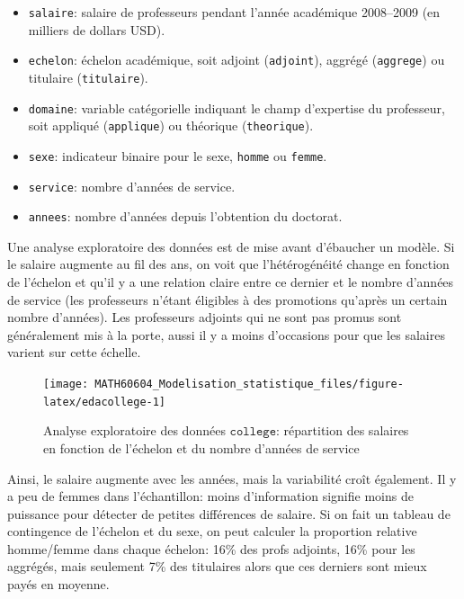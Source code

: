 \documentclass[
  11pt,
  letterpaper,
]{article}
\providecommand{\tightlist}{%
  \setlength{\itemsep}{0pt}\setlength{\parskip}{0pt}}
\theoremstyle{definition}
\theoremstyle{definition}
\theoremstyle{definition}
\theoremstyle{definition}
\theoremstyle{remark}
\begin{document}
\begin{itemize}
\tightlist
\item
  \texttt{salaire}: salaire de professeurs pendant l'année académique 2008--2009 (en milliers de dollars USD).
\item
  \texttt{echelon}: échelon académique, soit adjoint (\texttt{adjoint}), aggrégé (\texttt{aggrege}) ou titulaire (\texttt{titulaire}).
\item
  \texttt{domaine}: variable catégorielle indiquant le champ d'expertise du professeur, soit appliqué (\texttt{applique}) ou théorique (\texttt{theorique}).
\item
  \texttt{sexe}: indicateur binaire pour le sexe, \texttt{homme} ou \texttt{femme}.
\item
  \texttt{service}: nombre d'années de service.
\item
  \texttt{annees}: nombre d'années depuis l'obtention du doctorat.
\end{itemize}

Une analyse exploratoire des données est de mise avant d'ébaucher un modèle. Si le salaire augmente au fil des ans, on voit que l'hétérogénéité change en fonction de l'échelon et qu'il y a une relation claire entre ce dernier et le nombre d'années de service (les professeurs n'étant éligibles à des promotions qu'après un certain nombre d'années). Les professeurs adjoints qui ne sont pas promus sont généralement mis à la porte, aussi il y a moins d'occasions pour que les salaires varient sur cette échelle.

\begin{figure}

{\centering \texttt{[image: MATH60604\_Modelisation\_statistique\_files/figure-latex/edacollege-1]} 

}

\caption{Analyse exploratoire des données $\texttt{college}$: répartition des salaires en fonction de l'échelon et du nombre d'années de service}\label{fig:edacollege}
\end{figure}

Ainsi, le salaire augmente avec les années, mais la variabilité croît également. Il y a peu de femmes dans l'échantillon: moins d'information signifie moins de puissance pour détecter de petites différences de salaire. Si on fait un tableau de contingence de l'échelon et du sexe, on peut calculer la proportion relative homme/femme dans chaque échelon: 16\% des profs adjoints, 16\% pour les aggrégés, mais seulement 7\% des titulaires alors que ces derniers sont mieux payés en moyenne.
\end{document}
